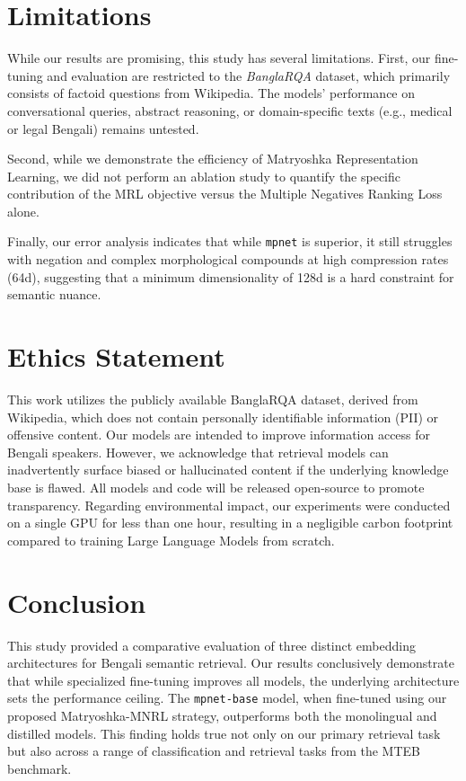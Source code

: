 \documentclass[acmsmall,screen,review]{acmart}
\begin{document}
\section{Limitations}

While our results are promising, this study has several limitations. First, our fine-tuning and evaluation are restricted to the \textit{BanglaRQA} dataset, which primarily consists of factoid questions from Wikipedia. The models' performance on conversational queries, abstract reasoning, or domain-specific texts (e.g., medical or legal Bengali) remains untested. 

Second, while we demonstrate the efficiency of Matryoshka Representation Learning, we did not perform an ablation study to quantify the specific contribution of the MRL objective versus the Multiple Negatives Ranking Loss alone. 

Finally, our error analysis indicates that while \texttt{mpnet} is superior, it still struggles with negation and complex morphological compounds at high compression rates (64d), suggesting that a minimum dimensionality of 128d is a hard constraint for semantic nuance.


\section{Ethics Statement}

This work utilizes the publicly available BanglaRQA dataset, derived from Wikipedia, which does not contain personally identifiable information (PII) or offensive content. Our models are intended to improve information access for Bengali speakers. However, we acknowledge that retrieval models can inadvertently surface biased or hallucinated content if the underlying knowledge base is flawed. All models and code will be released open-source to promote transparency. Regarding environmental impact, our experiments were conducted on a single GPU for less than one hour, resulting in a negligible carbon footprint compared to training Large Language Models from scratch.

\section{Conclusion}

This study provided a comparative evaluation of three distinct embedding architectures for Bengali semantic retrieval. Our results conclusively demonstrate that while specialized fine-tuning improves all models, the underlying architecture sets the performance ceiling. The \texttt{mpnet-base} model, when fine-tuned using our proposed Matryoshka-MNRL strategy, outperforms both the monolingual and distilled models. This finding holds true not only on our primary retrieval task but also across a range of classification and retrieval tasks from the MTEB benchmark.
\end{document}
